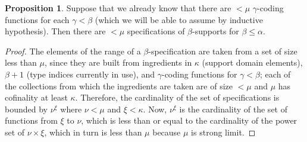 \documentclass[112pt]{article}
\theoremstyle{definition}
\newtheorem{proposition}[theorem]{Proposition}
\newtheorem{lemma}[theorem]{Lemma}
\theoremstyle{remark}
\newenvironment{annot}{\begin{center}\color{blue}\sl}{\end{center}}
\begin{document}
\begin{proposition}\label{prop:count_spec}
Suppose that we already know that there are $<\mu$ $\gamma$-coding functions for each $\gamma<\beta$ (which we will be able to assume by inductive hypothesis).
Then there are $<\mu$ specifications of $\beta$-supports for $\beta\leq \alpha$.
\end{proposition}
\begin{proof}
The elements of the range of a $\beta$-specification are taken from a set of size less than $\mu$, since they are built from ingredients in $\kappa$ (support domain elements), $\beta+1$ (type indices currently in use), and $\gamma$-coding functions for $\gamma<\beta$;  each of the collections from which the ingredients are taken are of size $<\mu$ and $\mu$ has cofinality at least $\kappa$.
Therefore, the cardinality of the set of specifications is bounded by $\nu^\xi$ where $\nu < \mu$ and $\xi < \kappa$.
Now, $\nu^\xi$ is the cardinality of the set of functions from $\xi$ to $\nu$, which is less than or equal to the cardinality of the power set of $\nu \times \xi$, which in turn is less than $\mu$ because $\mu$ is strong limit.
\end{proof}
\begin{comment}
But since strong limit cardinals are closed under exponentials (the content of the subsequent lemma \ref{lem:strong_limit_pow_lt}), this bound is strictly less than $\mu$.
\begin{annot}
  Alternative to the final sentence, putting the subsequent lemma inline:
  Now, $\nu^\xi$ is the cardinality of the set of functions from $\xi$ to $\nu$, which is less than or equal to the cardinality of the power set of $\nu \times \xi$, which in turn is less than $\mu$ because $\mu$ is strong limit.
  So this bound is strictly less than $\mu$ as required.
\end{annot}

\end{proof}
\begin{lemma}\label{lem:strong_limit_pow_lt}
If $\mu$ is any strong limit cardinal and $\nu, \xi < \mu$, then $\nu^\xi < \mu$.
\
\end{lemma}
\begin{proof}
If $\nu,\xi <\mu$ then $\nu^\xi$ is the cardinality of the set of functions from $\xi$ to $\nu$, which is less than or equal to the cardinality of the power set of $\nu \times \xi$, which is less than $\mu$ because $\mu$ is strong limit.
\end{proof}
\end{comment}
\end{document}
